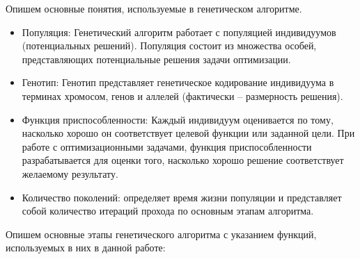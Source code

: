 \documentclass[12pt]{report}
\begin{document}
Опишем основные понятия, используемые в генетическом алгоритме.
\begin{itemize}
    \item Популяция: Генетический алгоритм работает с популяцией индивидуумов (потенциальных решений). Популяция состоит из множества особей, представляющих потенциальные решения задачи оптимизации.
    \item Генотип: Генотип представляет генетическое кодирование индивидуума в терминах хромосом, генов и аллелей (фактически -- размерность решения).
    \item Функция приспособленности: Каждый индивидуум оценивается по тому, насколько хорошо он соответствует целевой функции или заданной цели. 
    При работе с оптимизационными задачами, функция приспособленности разрабатывается для оценки того, насколько хорошо решение соответствует желаемому результату.
    \item Количество поколений: определяет время жизни популяции и представляет собой количество итераций прохода по основным этапам алгоритма.
\end{itemize}
Опишем основные этапы генетического алгоритма с указанием функций, используемых в них в данной работе:
\end{document}
